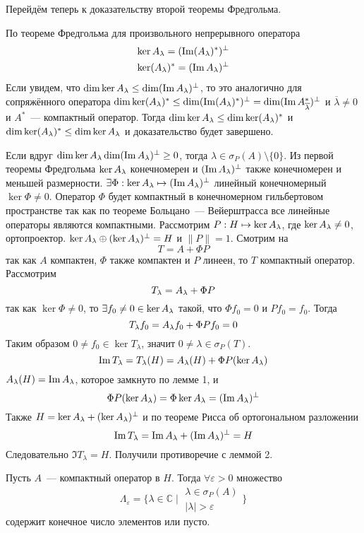 \documentclass[14pt]{extarticle}
\begin{document}
Перейдём теперь к доказательству второй теоремы Фредгольма.
\begin{Proof}
    По теореме Фредгольма для произвольного непрерывного оператора 
    \begin{gather*}
        \ker {\Al} = (\Im ({\Al})^*)^\perp\\
        \ker ({\Al})^* = (\Im {\Al})^\perp
    \end{gather*}
    Если увидем, что $\dim \ker \Al \le \dim (\Im \Al)^\perp$, то это 
    аналогично для сопряжённого оператора $\dim \ker (\Al)^* \le \dim (\Im(\Al
    )^*)^\perp = \dim (\Im A^*_{\overline{\lambda}})^\perp$ и $
    \overline{\lambda} \ne 0$ и $A^*$~--- компактный оператор.
    Тогда $\dim \ker \Al \le \dim \ker (\Al)^*$ и $\dim \ker (\Al)^* \le \dim 
    \ker \Al$ и доказательство будет завершено.
    
    Если вдруг $\dim \ker \Al  \dim (\Im \Al)^\perp \ge 0$, тогда
    $\lambda \in \sigma_P(A) \setminus \{0\}$.
    Из первой теоремы Фредгольма $\ker \Al$ конечномерен и $(\Im \Al)^\perp$
    также конечномерен и меньшей размерности.
    $\exists \Phi : \ker \Al \mapsto (\Im \Al)^\perp$ линейный конечномерный
    $\ker \Phi \ne 0$.
    Оператор $\Phi$ будет компактный в конечномерном гильбертовом пространстве
    так как по теореме Больцано~--- Вейерштрасса все линейные операторы являются
    компактными.
    Рассмотрим $P : H \mapsto \ker \Al$, где $\ker \Al \ne 0$, ортопроектор.
    $\ker \Al \oplus (\ker \Al)^\perp = H$ и $\|P\| = 1$.
    Смотрим на
    $$
    T = A + \Phi P
    $$
    так как $A$ компактен, $\Phi$ также компактен и $P$ линеен, то $T$ 
    компактный оператор.
    Рассмотрим
    $$
    T_\lambda = \Al + \Phi P
    $$
    так как $\ker \Phi \ne 0$, то $\exists f_0 \ne 0 \in \ker \Al$ такой, что
    $\Phi f_0 = 0$ и $P f_0 = f_0$.
    Тогда
    $$
    T_\lambda f_0 = \Al f_0 + \Phi P f_0 = 0
    $$
    Таким образом $0 \ne f_0 \in \ker T_\lambda$, значит $0 \ne \lambda \in 
    \sigma_P(T)$.
    $$
    \Im T_\lambda = T_\lambda(H) = \Al(H) + \Phi P(\ker \Al)
    $$
    $\Al(H) = \Im \Al$, которое замкнуто по лемме 1, и
    $$
    \Phi P(\ker \Al) = \Phi \ker \Al = (\Im \Al)^\perp
    $$
    Также $H = \ker \Al + (\ker \Al)^\perp$ и по теореме Рисса об ортогональном
    разложении
    $$
    \Im T_\lambda = \Im \Al + (\Im \Al)^\perp = H
    $$
    Следовательно $\Im T_\lambda = H$.
    Получили противоречие с леммой 2.
\end{Proof}
\begin{Theor}
    Пусть $A$~--- компактный оператор в $H$.
    Тогда $\forall \varepsilon > 0$ множество
    $$
    \Lambda_\varepsilon = \{\lambda \in \mathbb{C}\mid
    \begin{array}{l}
        \lambda \in \sigma_P(A)\\
        |\lambda| > \varepsilon    
    \end{array}
    \}
    $$
    содержит конечное число элементов или пусто.
\end{Theor}
\end{document}
